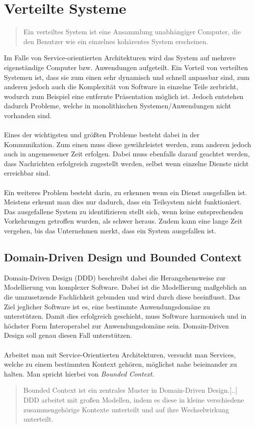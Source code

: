 \section{Verteilte Systeme}
\label{sec:VerteilteAnwendungen}
\begin{quotation}
    \frqq Ein verteiltes System ist eine Ansammlung unabhängiger Computer, die den Benutzer wie ein einzelnes kohärentes System erscheinen.\flqq\cite[S. 19]{tanenbaum:VerteilteSysteme}
\end{quotation}
Im Falle von Service-orientierten Architekturen wird das System auf mehrere eigenständige Computer bzw. Anwendungen aufgeteilt. Ein Vorteil von verteilten Systemen ist, dass sie zum einen sehr dynamisch und schnell anpassbar sind, zum anderen jedoch auch die Komplexität von Software in einzelne Teile zerbricht, wodurch zum Beispiel eine entfernte Präsentation möglich ist.
Jedoch entstehen dadurch Probleme, welche in monolithischen Systemen/Anwendungen nicht vorhanden sind.
\\\\
Eines der wichtigsten und größten Probleme besteht dabei in der Kommunikation. Zum einen muss diese gewährleistet werden, zum anderen jedoch auch in angemessener Zeit erfolgen. Dabei muss ebenfalls darauf geachtet werden, dass Nachrichten erfolgreich zugestellt werden, selbst wenn einzelne Dienste nicht erreichbar sind.
\\\\
Ein weiteres Problem besteht darin, zu erkennen wenn ein Dienst ausgefallen ist. Meistens erkennt man dies nur dadurch, dass ein Teilsystem nicht funktioniert. Das ausgefallene System zu identifizieren stellt sich, wenn keine entsprechenden Vorkehrungen getroffen wurden, als schwer heraus. Zudem kann eine lange Zeit vergehen, bis das Unternehmen merkt, dass ein System ausgefallen ist.

\subsection{Domain-Driven Design und Bounded Context}
\label{sec:boundedContext}
Domain-Driven Design (DDD) beschreibt dabei die Herangehensweise zur Modellierung von komplexer Software. Dabei ist die Modellierung maßgeblich an die umzusetzende Fachlichkeit gebunden und wird durch diese beeinflusst. Das Ziel jeglicher Software ist es, eine bestimmte Anwendungsdomäne zu unterstützen. Damit dies erfolgreich geschieht, muss Software harmonisch und in höchster Form Interoperabel zur Anwendungsdomäne sein. Domain-Driven Design soll genau diesen Fall unterstützen.
\\\\
Arbeitet man mit Service-Orientierten Architekturen, versucht man Services, welche zu einem bestimmten Kontext gehören, möglichst nahe beieinander zu halten. Man spricht hierbei von \textit{Bounded Context}. 
\begin{quotation}
    \frqq Bounded Context ist ein zentrales Muster in Domain-Driven Design.[..] DDD arbeitet mit großen Modellen, indem es diese in kleine verschiedene zusammengehörige Kontexte unterteilt und auf ihre Wechselwirkung unterteilt.\flqq \cite{mfowler:BoundedContext}
\end{quotation}

